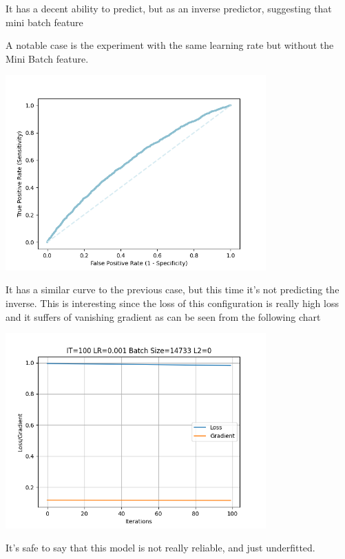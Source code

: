 \documentclass[
	letterpaper, %
	10pt, %
]{class}
\begin{document}
It has a decent ability to predict, but as an inverse predictor, suggesting that mini batch feature

A notable case is the experiment with the same learning rate but without the Mini Batch feature.

\begin{center}
    \includegraphics[width=10cm]{../images/roc_2.png}
\end{center}

It has a similar curve to the previous case, but this time it's not predicting the inverse. This is interesting since the loss of this configuration is really high loss and it suffers of vanishing gradient as can be seen from the following chart

\begin{center}
    \includegraphics[width=10cm]{../images/graph_3.png}
\end{center}

It's safe to say that this model is not really reliable, and just underfitted.
\end{document}
